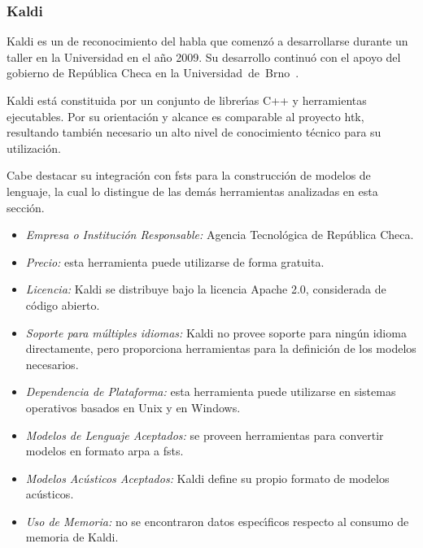 \subsubsection{Kaldi}
\label{sec:kaldi}

Kaldi es un  de reconocimiento del habla que comenz\'o a desarrollarse durante un taller
en la Universidad  en el a\~no 2009. Su desarrollo continu\'o con el apoyo del gobierno
de Rep\'ublica Checa en la \mbox{Universidad de Brno \cite{Povey_ASRU2011}}.

Kaldi est\'a constituida por un conjunto de librer{\'\i}as C++ y herramientas ejecutables. Por su orientaci\'on y
alcance es comparable al proyecto \gls{htk}, resultando tambi\'en necesario un alto nivel de conocimiento t\'ecnico
para su utilizaci\'on.

Cabe destacar su integraci\'on con \gls{fst}s para la
construcci\'on de modelos de lenguaje, la cual lo distingue de las dem\'as herramientas analizadas en esta secci\'on.

\begin{itemize}
	\item \emph{Empresa o Instituci\'on Responsable:} Agencia Tecnol\'ogica de Rep\'ublica Checa.
	\item \emph{Precio:} esta herramienta puede utilizarse de forma gratuita.
	\item \emph{Licencia:} Kaldi se distribuye bajo la licencia Apache 2.0, considerada de c\'odigo abierto.
	\item \emph{Soporte para m\'ultiples idiomas:} Kaldi no provee soporte para ning\'un
	idioma directamente, pero proporciona herramientas para la definici\'on de los modelos necesarios.
	\item \emph{Dependencia de Plataforma:} esta herramienta puede utilizarse en sistemas operativos
	basados en Unix y en Windows.
	\item \emph{Modelos de Lenguaje Aceptados:} se proveen herramientas para convertir modelos en formato
	\gls{arpa} a \gls{fst}s.
	\item \emph{Modelos Ac\'usticos Aceptados:} Kaldi define su propio formato de modelos ac\'usticos.
	\item \emph{Uso de Memoria:} no se encontraron datos espec{\'\i}ficos respecto al consumo de memoria
	de Kaldi.
\end{itemize}